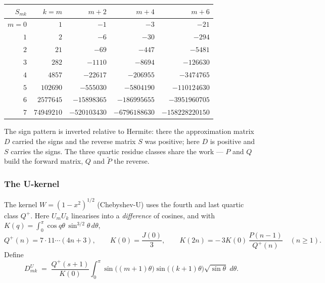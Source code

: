 \documentclass[11pt,a4paper]{article}
\theoremstyle{definition}
\begin{document}
\begin{tcolorbox}[colback=black!5, colframe=black!5, boxrule=0pt, sharp corners]
\begin{center}
\begin{tabular}{r|rrrr}
$S_{mk}$ & $k=m$ & $m{+}2$ & $m{+}4$ & $m{+}6$ \\
\hline
$m=0$ & $1$        & $-1$         & $-3$          & $-21$ \\
$1$   & $2$        & $-6$         & $-30$         & $-294$ \\
$2$   & $21$       & $-69$        & $-447$        & $-5481$ \\
$3$   & $282$      & $-1110$      & $-8694$       & $-126630$ \\
$4$   & $4857$     & $-22617$     & $-206955$     & $-3474765$ \\
$5$   & $102690$   & $-555030$    & $-5804190$    & $-110124630$ \\
$6$   & $2577645$  & $-15898365$  & $-186995655$  & $-3951960705$ \\
$7$   & $74949210$ & $-520103430$ & $-6796188630$ & $-158228220150$ \\
\end{tabular}
\end{center}
\end{tcolorbox}

The sign pattern is inverted relative to Hermite: there the
approximation matrix $D$ carried the signs and the reverse matrix $S$
was positive; here $D$ is positive and $S$ carries the signs. The
three quartic residue classes share the work --- $P$ and $Q$ build the
forward matrix, $Q$ and $\widetilde P$ the reverse.

\subsubsection*{The U-kernel}

The kernel $W = (1-x^2)^{1/2}$ (Chebyshev-U) uses the fourth and
last quartic class $Q^{+}$. Here $U_m U_k$ linearises into a
\emph{difference} of cosines, and with
$K(q) = \int_0^\pi \cos q\theta\, \sin^{3/2}\theta\, d\theta$,
\[
  Q^{+}(n) = 7 \cdot 11 \cdots (4n+3),
  \qquad
  K(0) = \frac{J(0)}{3},
  \qquad
  K(2n) = -\,3K(0)\, \frac{P(n-1)}{Q^{+}(n)} \quad (n \ge 1).
\]
Define
\[
  D^U_{mk} \;=\; \frac{Q^{+}(s+1)}{K(0)}
  \int_0^\pi \sin\bigl((m{+}1)\theta\bigr) \sin\bigl((k{+}1)\theta\bigr)
  \sqrt{\sin\theta}\; d\theta .
\]
\end{document}
